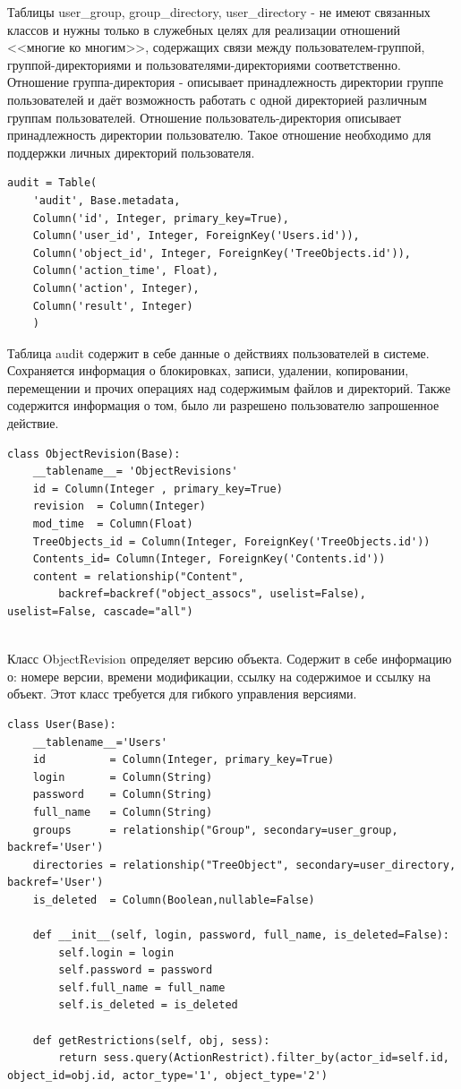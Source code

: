 \documentclass[utf8,usehyperref,12pt]{G7-32}
\begin{document}
Таблицы user\_group, group\_directory, user\_directory - не имеют связанных классов и нужны только в служебных целях для реализации отношений <<многие ко многим>>, содержащих связи между пользователем-группой, группой-директориями и пользователями-директориями соответственно. 
Отношение группа-директория - описывает принадлежность директории группе пользователей и даёт возможность работать с одной директорией различным группам пользователей. 
Отношение пользователь-директория описывает принадлежность директории пользователю. Такое отношение необходимо для поддержки личных директорий пользователя.

\begin{verbatim}
audit = Table(
    'audit', Base.metadata,    
    Column('id', Integer, primary_key=True),
    Column('user_id', Integer, ForeignKey('Users.id')),
    Column('object_id', Integer, ForeignKey('TreeObjects.id')),
    Column('action_time', Float),
    Column('action', Integer),
    Column('result', Integer)
    )
\end{verbatim}

Таблица audit содержит в себе данные о действиях пользователей в системе. Сохраняется информация о блокировках, записи, удалении, копировании, перемещении и прочих операциях над содержимым файлов и директорий. Также содержится информация о том, было ли разрешено пользователю запрошенное действие.

\begin{verbatim}
class ObjectRevision(Base):
    __tablename__= 'ObjectRevisions'
    id = Column(Integer , primary_key=True)
    revision  = Column(Integer)
    mod_time  = Column(Float)
    TreeObjects_id = Column(Integer, ForeignKey('TreeObjects.id'))
    Contents_id= Column(Integer, ForeignKey('Contents.id'))
    content = relationship("Content", 
    	backref=backref("object_assocs", uselist=False), uselist=False, cascade="all")
    
\end{verbatim}

Класс ObjectRevision определяет версию объекта. Содержит в себе информацию о: номере версии, времени модификации, ссылку на содержимое и ссылку на объект. Этот класс требуется для гибкого управления версиями.

\begin{verbatim}        
class User(Base):
    __tablename__='Users'
    id          = Column(Integer, primary_key=True)
    login       = Column(String)
    password    = Column(String)
    full_name   = Column(String)
    groups      = relationship("Group", secondary=user_group, backref='User')
    directories = relationship("TreeObject", secondary=user_directory, backref='User')
    is_deleted  = Column(Boolean,nullable=False)
    
    def __init__(self, login, password, full_name, is_deleted=False):
        self.login = login
        self.password = password
        self.full_name = full_name
        self.is_deleted = is_deleted
    
    def getRestrictions(self, obj, sess):        
        return sess.query(ActionRestrict).filter_by(actor_id=self.id, object_id=obj.id, actor_type='1', object_type='2')
\end{verbatim}
\end{document}
